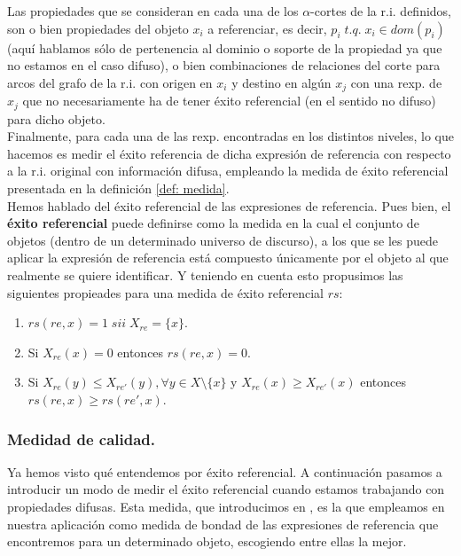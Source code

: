 \documentclass[10pt,a4paper]{article}
\begin{document}
Las propiedades que se consideran en cada una de los $\alpha$-cortes de la r.i. definidos, son o bien propiedades del objeto $x_i$ a referenciar, es decir, $p_i \; t.q. \; x_i \in dom(p_i)$ (aquí hablamos sólo de pertenencia al dominio o soporte de la propiedad ya que no estamos en el caso difuso), o bien combinaciones de relaciones del corte para arcos del grafo de la r.i. con origen en $x_i$ y destino en algún $x_j$ con una rexp. de $x_j$ que no necesariamente ha de tener éxito referencial (en el sentido no difuso) para dicho objeto.\\

Finalmente, para cada una de las rexp. encontradas en los distintos niveles, lo que hacemos es medir el éxito referencia de dicha expresión de referencia con respecto a la r.i. original con información difusa, empleando la medida de éxito referencial presentada en la definición \ref{def: medida}.\\

Hemos hablado del éxito referencial de las expresiones de referencia. Pues bien, el \textbf{éxito referencial} puede definirse como la medida en la cual el conjunto de objetos (dentro de un determinado universo de discurso), a los que se les puede aplicar la expresión de referencia está compuesto únicamente por el objeto al que realmente se quiere identificar. Y teniendo en cuenta esto propusimos las siguientes propieades para una medida de éxito referencial $rs$:

\begin{enumerate}
\item $rs(re, x) = 1 \; sii \; X_{re} = \lbrace x \rbrace$.
\item Si $X_{re}(x) = 0$ entonces $rs(re, x) = 0$.
\item Si $X_{re}(y) \leq X_{re'}(y), \forall y \in X\setminus\lbrace x\rbrace$ y $X_{re}(x) \geq X_{re'}(x)$ entonces $rs(re, x) \geq rs(re', x)$.
\end{enumerate}

\subsubsection{Medidad de calidad.}

Ya hemos visto qué entendemos por éxito referencial. A continuación pasamos a introducir un modo de medir el éxito referencial cuando estamos trabajando con propiedades difusas. Esta medida, que introducimos en \cite{artReferentialSuccessCuts}, es la que empleamos en nuestra aplicación como medida de bondad de las expresiones de referencia que encontremos para un determinado objeto, escogiendo entre ellas la mejor.\\
\end{document}
